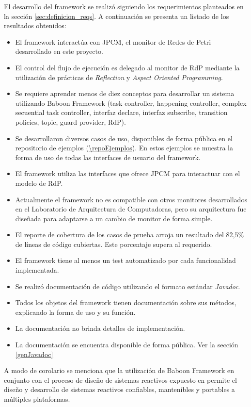 El desarrollo del framework se realizó siguiendo los requerimientos planteados
en la sección \ref{sec:definicion_reqs}. A continuación se presenta un listado
de los resultados obtenidos:
\begin{itemize}
  \item El framework interactúa con JPCM, el monitor de Redes de Petri
  desarrollado en este proyecto.
  \item El control del flujo de ejecución es delegado al monitor de RdP
  mediante la utilización de prácticas de \textit{Reflection} y \textit{Aspect
  Oriented Programming}.
  \item Se requiere aprender menos de diez conceptos para desarrollar un
  sistema utilizando Baboon Framework (task controller, happening
  controller, complex secuential task controller, interfaz declare, interfaz
  subscribe, transition policies, topic, guard provider, RdP).
  \item Se desarrollaron diversos casos de uso, disponibles de forma pública en
  el repositorio de ejemplos (\url{\repoEjemplos}). En estos ejemplos se muestra
  la forma de uso de todas las interfaces de usuario del framework.
  \item El framework utiliza las interfaces que ofrece JPCM para interactuar con
  el modelo de RdP.
  \item Actualmente el framework no es compatible con otros monitores
  desarrollados en el Laboratorio de Arquitectura de Computadoras, pero su
  arquitectura fue diseñada para adaptarse a un cambio de monitor de forma
  simple.
  \item El reporte de cobertura de los casos de prueba arroja un resultado del
  82,5\% de líneas de código cubiertas. Este porcentaje supera al requerido.
  \item El framework tiene al menos un test automatizado por cada funcionalidad
  implementada.
  \item Se realizó documentación de código utilizando el formato estándar
  \textit{Javadoc}.
  \item Todos los objetos del framework tienen documentación sobre sus métodos,
  explicando la forma de uso y su función.
  \item La documentación no brinda detalles de implementación.
  \item La documentación se encuentra disponible de forma pública. Ver la
  sección \ref{genJavadoc}
\end{itemize}

A modo de corolario se menciona que la utilización de Baboon Framework
en conjunto con el proceso de diseño de sistemas reactivos expuesto en
\cite{Bentivegna-Ludemann} permite el diseño y desarrollo de sistemas reactivos
confiables, mantenibles y portables a múltiples plataformas.
